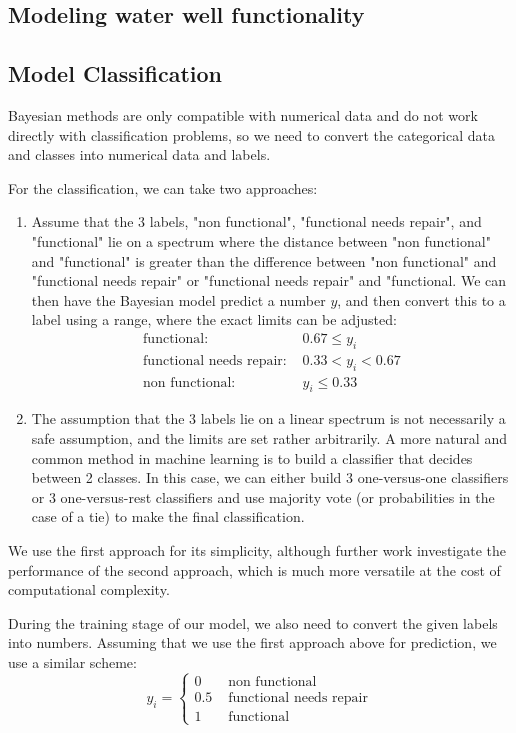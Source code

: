 \documentclass{article} %
\begin{document}
\begin{multicols}{2}
\section{Modeling water well functionality}

\subsection{Model Classification}

Bayesian methods are only compatible with numerical data and do not work directly with classification problems, so we need to convert the categorical data and classes into numerical data and labels.

For the classification, we can take two approaches:
\begin{enumerate}
\item Assume that the 3 labels, "non functional", "functional needs repair", and "functional" lie on a spectrum where the distance between "non functional" and "functional" is greater than the difference between "non functional" and "functional needs repair" or "functional needs repair" and "functional. We can then have the Bayesian model predict a number $y$, and then convert this to a label using a range, where the exact limits can be adjusted:
\begin{align*}
\text{functional: } & 0.67\leq y_i \\
\text{functional needs repair: } & 0.33<y_i<0.67 \\
\text{non functional: } &  y_i \leq 0.33
\end{align*}
\item The assumption that the 3 labels lie on a linear spectrum is not necessarily a safe assumption, and the limits are set rather arbitrarily. A more natural and common method in machine learning is to build a classifier that decides between 2 classes. In this case, we can either build 3 one-versus-one classifiers or 3 one-versus-rest classifiers and use majority vote (or probabilities in the case of a tie) to make the final classification.
\end{enumerate}

We use the first approach for its simplicity, although further work investigate the performance of the second approach, which is much more versatile at the cost of computational complexity.

During the training stage of our model, we also need to convert the given labels into numbers. Assuming that we use the first approach above for prediction, we use a similar scheme:
\begin{equation*}
y_i = 
\begin{cases}
0 & \text{ non functional}\\
0.5 & \text{ functional needs repair}\\
1 & \text{ functional}
\end{cases}
\end{equation*}


\end{multicols}
\end{document}

